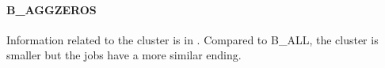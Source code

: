 \documentclass{jhps}
\makeatletter
\newcommand{\jk}[1]{\todo[inline]{JK:\@#1}}
\newcommand{\eb}[1]{\todo[inline, color=GreenYellow]{EB:\@#1}}
\makeatother
\begin{document}
\FloatBarrier
\paragraph{B\_AGGZEROS}
Information related to the cluster is in .
Compared to B\_ALL, the cluster is smaller but the jobs have a more similar ending.

\end{document}
